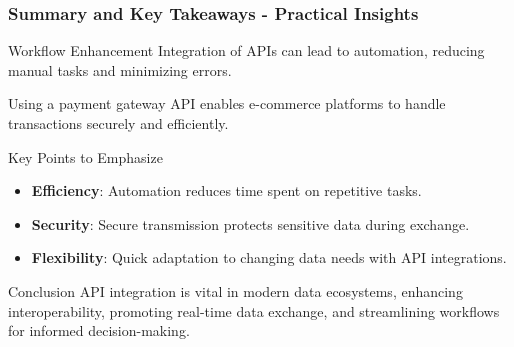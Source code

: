 \documentclass[aspectratio=169]{beamer}
\begin{document}
\begin{frame}[fragile]
    \frametitle{Summary and Key Takeaways - Practical Insights}

    \begin{block}{Workflow Enhancement}
        Integration of APIs can lead to automation, reducing manual tasks and minimizing errors. 
        \begin{example}
            Using a payment gateway API enables e-commerce platforms to handle transactions securely and efficiently.
        \end{example}
    \end{block}
    
    \begin{block}{Key Points to Emphasize}
        \begin{itemize}
            \item \textbf{Efficiency}: Automation reduces time spent on repetitive tasks.
            \item \textbf{Security}: Secure transmission protects sensitive data during exchange.
            \item \textbf{Flexibility}: Quick adaptation to changing data needs with API integrations.
        \end{itemize}
    \end{block}
    
    \begin{block}{Conclusion}
        API integration is vital in modern data ecosystems, enhancing interoperability, promoting real-time data exchange, and streamlining workflows for informed decision-making.
    \end{block}
\end{frame}
\end{document}
